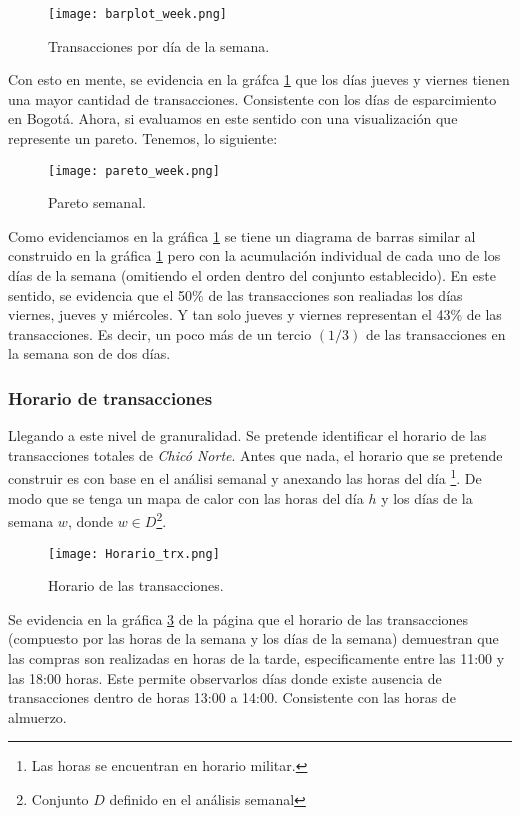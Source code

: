 \documentclass[a4paper]{article}
\begin{document}
\begin{figure}[h]
    \centering
	\texttt{[image: barplot\_week.png]}
    \caption{Transacciones por día de la semana.}
    \label{fig:barplot_week}
\end{figure}

Con esto en mente, se evidencia en la gráfca \ref{fig:barplot_week} que los días jueves y viernes tienen una mayor cantidad de transacciones. Consistente con los días de esparcimiento en Bogotá. Ahora, si evaluamos en este sentido con una visualización que represente un pareto. Tenemos, lo siguiente:

\begin{figure}[h]
    \centering
	\texttt{[image: pareto\_week.png]}
    \caption{Pareto semanal.}
    \label{fig:pareto_week}
\end{figure}

Como evidenciamos en la gráfica \ref{fig:barplot_week} se tiene un diagrama de barras similar al construido en la gráfica \ref{fig:barplot_week} pero con la acumulación individual de cada uno de los días de la semana (omitiendo el orden dentro del conjunto establecido). En este sentido, se evidencia que el 50\% de las transacciones son realiadas los días viernes, jueves y miércoles. Y tan solo jueves y viernes representan el 43\% de las transacciones. Es decir, un poco más de un tercio $(1/3)$ de las transacciones en la semana son de dos días.

\subsubsection*{Horario de transacciones}

Llegando a este nivel de granuralidad. Se pretende identificar el horario de las transacciones totales de \textit{Chicó Norte}. Antes que nada, el horario que se pretende construir es con base en el análisi semanal y anexando las horas del día \footnote{Las horas se encuentran en horario militar.}. De modo que se tenga un mapa de calor con las horas del día $h$ y los días de la semana $w$, donde $w \in D$\footnote{Conjunto $D$ definido en el análisis semanal}.

\begin{figure}[h]
    \centering
	\texttt{[image: Horario\_trx.png]}
    \caption{Horario de las transacciones.}
    \label{fig:horario_trx}
\end{figure}

Se evidencia en la gráfica \ref{fig:horario_trx} de la página \pageref{fig:horario_trx} que el horario de las transacciones (compuesto por las horas de la semana y los días de la semana) demuestran que las compras son realizadas en horas de la tarde, especificamente entre las 11:00 y las 18:00 horas. Este permite observarlos días donde existe ausencia de transacciones dentro de horas 13:00 a 14:00. Consistente con las horas de almuerzo.
\end{document}

